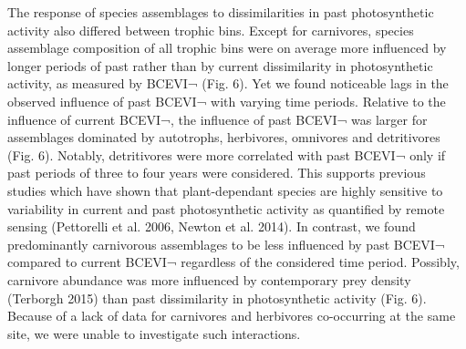 	The response of species assemblages to dissimilarities in past photosynthetic activity also differed between trophic bins. Except for carnivores, species assemblage composition of all trophic bins were on average more influenced by longer periods of past rather than by current dissimilarity in photosynthetic activity, as measured by BCEVI¬ (Fig. 6). Yet we found noticeable lags in the observed influence of past BCEVI¬ with varying time periods. Relative to the influence of current BCEVI¬, the influence of past BCEVI¬ was larger for assemblages dominated by autotrophs, herbivores, omnivores and detritivores (Fig. 6). Notably, detritivores were more correlated with past BCEVI¬ only if past periods of three to four years were considered. This supports previous studies which have shown that plant-dependant species are highly sensitive to variability in current and past photosynthetic activity as quantified by remote sensing (Pettorelli et al. 2006, Newton et al. 2014). In contrast, we found predominantly carnivorous assemblages to be less influenced by past BCEVI¬ compared to current BCEVI¬ regardless of the considered time period. Possibly, carnivore abundance was more influenced by contemporary prey density (Terborgh 2015) than past dissimilarity in photosynthetic activity (Fig. 6). Because of a lack of data for carnivores and herbivores co-occurring at the same site, we were unable to investigate such interactions. 

